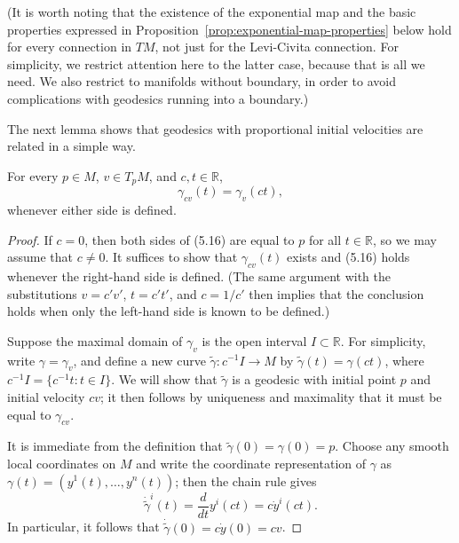 (It is worth noting that the existence of the exponential map and the basic properties expressed in Proposition~\ref{prop:exponential-map-properties} below hold for every connection in $TM$, not just for the Levi-Civita connection. For simplicity, we restrict attention here to the latter case, because that is all we need. We also restrict to manifolds without boundary, in order to avoid complications with geodesics running into a boundary.)

The next lemma shows that geodesics with proportional initial velocities are related in a simple way.

\begin{lemma}
\label{lem:rescaling-lemma}

For every $p \in M$, $v \in T_p M$, and $c,t \in \mathbb{R}$,
\begin{equation}
\gamma_{cv}(t) = \gamma_v(ct), \tag{5.16}
\end{equation}
whenever either side is defined.

\begin{proof}
If $c = 0$, then both sides of (5.16) are equal to $p$ for all $t \in \mathbb{R}$, so we may assume that $c \neq 0$. It suffices to show that $\gamma_{cv}(t)$ exists and (5.16) holds whenever the right-hand side is defined. (The same argument with the substitutions $v = c'v'$, $t = c't'$, and $c = 1/c'$ then implies that the conclusion holds when only the left-hand side is known to be defined.)

Suppose the maximal domain of $\gamma_v$ is the open interval $I \subset \mathbb{R}$. For simplicity, write $\gamma = \gamma_v$, and define a new curve $\tilde{\gamma}: c^{-1}I \to M$ by $\tilde{\gamma}(t) = \gamma(ct)$, where $c^{-1}I = \{c^{-1}t : t \in I\}$. We will show that $\tilde{\gamma}$ is a geodesic with initial point $p$ and initial velocity $cv$; it then follows by uniqueness and maximality that it must be equal to $\gamma_{cv}$.

It is immediate from the definition that $\tilde{\gamma}(0) = \gamma(0) = p$. Choose any smooth local coordinates on $M$ and write the coordinate representation of $\gamma$ as $\gamma(t) = (y^1(t), \ldots, y^n(t))$; then the chain rule gives
\[
\dot{\tilde{\gamma}}^i(t) = \frac{d}{dt} y^i(ct) = c\dot{y}^i(ct).
\]
In particular, it follows that $\dot{\tilde{\gamma}}(0) = c\dot{y}(0) = cv$.


\end{proof}
\end{lemma}
